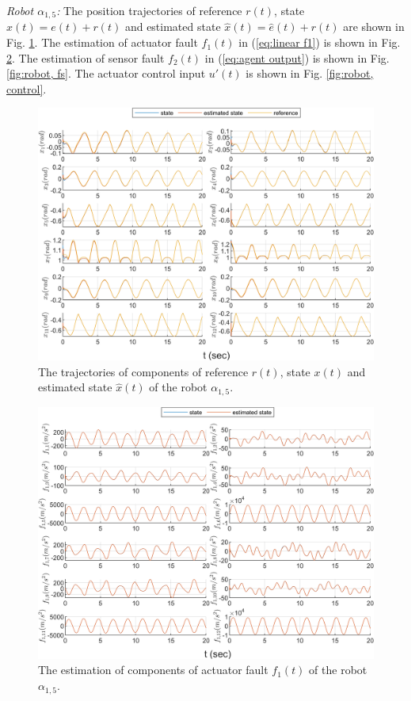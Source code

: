 \documentclass[journal,12pt,onecolumn,draftclsnofoot,]{IEEEtran}
\begin{document}
\textit{Robot $\alpha_{1,5}$:}
The position trajectories of reference $r(t)$, state $x(t) = e(t) + r(t)$ and estimated state $\hat{x}(t) = \hat{e}(t) + r(t)$ are shown in Fig. \ref{fig:robot, state}. The estimation of actuator fault $f_1(t)$ in (\ref{eq:linear f1}) is shown in Fig. \ref{fig:robot, fa}. The estimation of sensor fault $f_2(t)$ in (\ref{eq:agent output}) is shown in Fig. \ref{fig:robot, fs}. The actuator control input $u'(t)$ is shown in Fig. \ref{fig:robot, control}.
\begin{figure}[htbp]
    \centering
    \includegraphics[scale=.57]{fig/robot (1).png}\caption{The trajectories of components of reference $r(t)$, state $x(t)$ and estimated state $\hat{x}(t)$ of the robot $\alpha_{1,5}$.}%
    \label{fig:robot, state}
\end{figure}
\begin{figure}[htbp]
    \centering
    \includegraphics[scale=.57]{fig/robot (2).png}\caption{The estimation of components of actuator fault $f_1(t)$ of the robot $\alpha_{1,5}$.}%
    \label{fig:robot, fa}
\end{figure}
\end{document}
